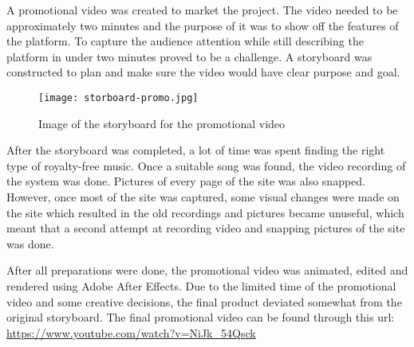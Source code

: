 A promotional video was created to market the project. The video needed to be approximately two minutes and the purpose of it was to show off the features of the platform.
To capture the audience attention while still describing the platform in under two minutes proved to be a challenge. A storyboard was constructed to plan and make sure the video would have clear purpose and goal.
\begin{figure}[h]
    \centering
    \texttt{[image: storboard-promo.jpg]}
    \caption{Image of the storyboard for the promotional video}
\end{figure}
After the storyboard was completed, a lot of time was spent finding the right type of royalty-free music. Once a suitable song was found, the video recording of the system was done. Pictures of every page of the site was also snapped. However, once most of the site was captured, some visual changes were made on the site which resulted in the old recordings and pictures became unuseful, which meant that a second attempt at recording video and snapping pictures of the site was done.

After all preparations were done, the promotional video was animated, edited and rendered using Adobe After Effects. Due to the limited time of the promotional video and some creative decisions, the final product deviated somewhat from the original storyboard. The final promotional video can be found through this url: \url{https://www.youtube.com/watch?v=NiJk_54Qsck}
